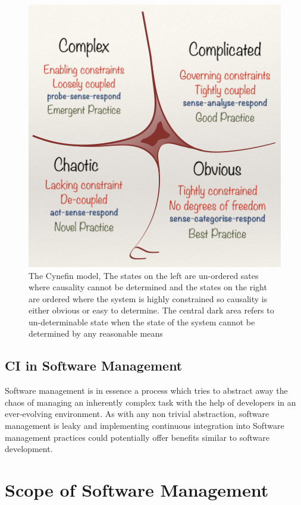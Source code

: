 \documentclass[12pt,conference]{IEEEtran}
\begin{document}
\begin{figure}[hbtp]
\includegraphics[scale=0.55]{cynefin.png}
\caption{The Cynefin model, The states on the left are un-ordered sates where causality cannot be determined and the states on the right are ordered where the system is highly constrained so causality is either obvious or easy to determine. The central dark area refers to un-determinable state when the state of the system cannot be determined by any reasonable means  \cite{snowden_leaders_2007}}
\label{cynefin}
\end{figure}

\subsection*{CI in Software Management}

Software management is in essence a process which tries to abstract away the chaos of managing an inherently complex task with the help of developers in an ever-evolving environment. As with any non trivial abstraction, software management is leaky and implementing continuous integration into Software management practices could potentially offer benefits similar to software development.


\section*{Scope of Software Management}
\end{document}
